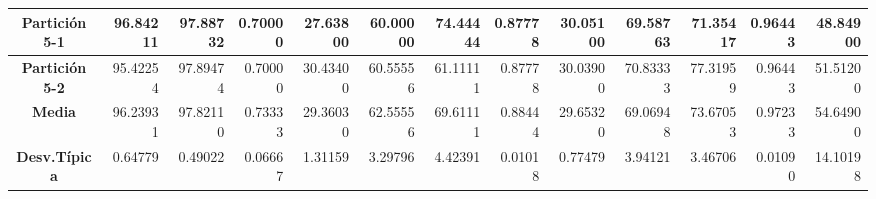 \documentclass[a4paper,11pt]{article}
\begin{document}
\begin{table}[H]
\begin{adjustbox}{width=1.1\textwidth}
\begin{tabular}{|c|r|r|r|r|r|r|r|r|r|r|r|r|}
  \textbf{Partición 5-1} & 96.84211 & 97.88732 & 0.70000 & 27.63800 & 60.00000 & 74.44444 & 0.87778 & 30.05100 & 69.58763 & 71.35417 & 0.96443 & 48.84900 \\ \hline
  \textbf{Partición 5-2} & 95.42254 & 97.89474 & 0.70000 & 30.43400 & 60.55556 & 61.11111 & 0.87778 & 30.03900 & 70.83333 & 77.31959 & 0.96443 & 51.51200 \\ \hline
  \textbf{Media} & 96.23931 & 97.82110 & 0.73333 & 29.36030 & 62.55556 & 69.61111 & 0.88444 & 29.65320 & 69.06948 & 73.67053 & 0.97233 & 54.64900 \\ \hline
  \textbf{Desv.Típica} & 0.64779 & 0.49022 & 0.06667 & 1.31159 & 3.29796 & 4.42391 & 0.01018 & 0.77479 & 3.94121 & 3.46706 & 0.01090 & 14.10198 \\ \hline
  \end{tabular}
  \end{adjustbox}
  \label{SCH}
  \end{table}
  
\end{document}
